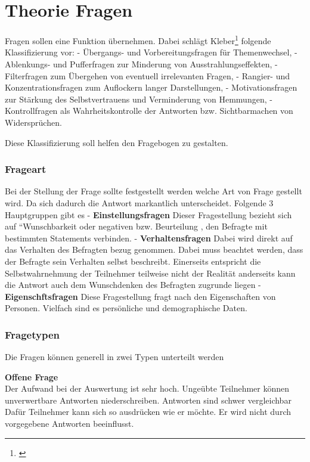 \newpage

\section{Theorie Fragen}\label{theorie-fragen}

Fragen sollen eine Funktion übernehmen. Dabei schlägt Kleber\footnote{\autocite{kleber92}}
folgende Klassifizierung vor: - Übergangs- und Vorbereitungsfragen für
Themenwechsel, - Ablenkungs- und Pufferfragen zur Minderung von
Ausstrahlungseffekten, - Filterfragen zum Übergehen von eventuell
irrelevanten Fragen, - Rangier- und Konzentrationsfragen zum Auflockern
langer Darstellungen, - Motivationsfragen zur Stärkung des
Selbstvertrauens und Verminderung von Hemmungen, - Kontrollfragen als
Wahrheitskontrolle der Antworten bzw. Sichtbarmachen von Widersprüchen.

Diese Klassifizierung soll helfen den Fragebogen zu gestalten.

\subsubsection{Frageart}\label{frageart}

Bei der Stellung der Frage sollte festgestellt werden welche Art von
Frage gestellt wird. Da sich dadurch die Antwort markantlich
unterscheidet. Folgende 3 Hauptgruppen gibt es -
\textbf{Einstellungsfragen} Dieser Fragestellung bezieht sich auf
``Wunschbarkeit oder negativen bzw. Beurteilung , den Befragte mit
bestimmten Statements verbinden. - \textbf{Verhaltensfragen} Dabei wird
direkt auf das Verhalten des Befragten bezug genommen. Dabei muss
beachtet werden, dass der Befragte sein Verhalten selbst beschreibt.
Einerseits entspricht die Selbstwahrnehmung der Teilnehmer teilweise
nicht der Realität anderseits kann die Antwort auch dem Wunschdenken des
Befragten zugrunde liegen - \textbf{Eigenschftsfragen} Diese
Fragestellung fragt nach den Eigenschaften von Personen. Vielfach sind
es persönliche und demographische Daten.

\subsubsection{Fragetypen}\label{fragetypen}

Die Fragen können generell in zwei Typen unterteilt werden

\textbf{Offene Frage}\\
Der Aufwand bei der Auswertung ist sehr hoch. Ungeübte Teilnehmer können
unverwertbare Antworten niederschreiben. Antworten sind schwer
vergleichbar Dafür Teilnehmer kann sich so ausdrücken wie er möchte. Er
wird nicht durch vorgegebene Antworten beeinflusst.

